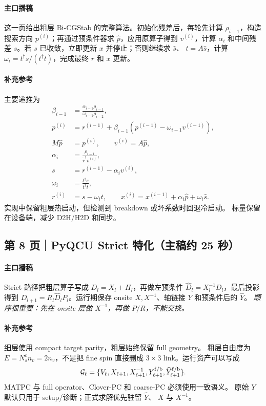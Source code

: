 \documentclass[UTF8,a4paper,11pt,fontset=none]{ctexart}
\begin{document}
\paragraph{主口播稿}
这一页给出粗层 Bi-CGStab 的完整算法。初始化残差后，每轮先计算
\(\rho_{i-1}\)，构造搜索方向 \(p^{(i)}\)；再通过预条件器求
\(\hat p\)，应用原算子得到 \(v^{(i)}\)，计算 \(\alpha_i\) 和中间残差
\(s\)。若 \(s\) 已收敛，立即更新 \(x\) 并停止；否则继续求 \(\hat s\)、
\(t=A\hat s\)，计算 \(\omega_i=t^\dagger s/(t^\dagger t)\)，完成最终
\(r\) 和 \(x\) 更新。

\paragraph{补充参考}
主要递推为
\begin{align}
\beta_{i-1}&=
\frac{\alpha_{i-1}\rho_{i-1}}
{\omega_{i-1}\rho_{i-2}},\\
p^{(i)}&=r^{(i-1)}
+\beta_{i-1}\left(p^{(i-1)}-\omega_{i-1}v^{(i-1)}\right),\\
M\hat p&=p^{(i)},\qquad v^{(i)}=A\hat p,\\
\alpha_i&=\frac{\rho_{i-1}}{\tilde r^\dagger v^{(i)}},\\
s&=r^{(i-1)}-\alpha_i v^{(i)},\\
\omega_i&=\frac{t^\dagger s}{t^\dagger t},\\
r^{(i)}&=s-\omega_i t,\qquad
x^{(i)}=x^{(i-1)}+\alpha_i\hat p+\omega_i\hat s.
\end{align}
实现中保留粗层热启动，但检测到 breakdown 或坏系数时回退冷启动。
标量保留在设备端，减少 D2H/H2D 和同步。

\subsection{第 8 页｜PyQCU Strict 特化（主稿约 25 秒）}

\paragraph{主口播稿}
Strict 路径把粗层算子写成 \(D_l=X_l+H_l\)，再做左预条件
\(\widehat D_l=X_l^{-1}D_l\)，最后投影得到
\(D_{l+1}=R_l\widehat D_lP_l\)。运行期保存 onsite
\(X,X^{-1}\)、轴链接 \(Y\) 和预条件后的 \(\widehat Y\)。
\emph{顺序很重要：先在 onsite 层做 \(X^{-1}\)，再做 \(P/R\)，不能交换。}

\paragraph{补充参考}
细层使用 compact target parity，粗层始终保留 full geometry。
粗层自由度为 \(E=N_s^c n_v=2n_v\)，不是把 fine spin 直接删成
\(3\times3\) link。运行资产可以写成
\[
\mathcal G_\ell=
\{V_\ell,X_{\ell+1},X_{\ell+1}^{-1},
Y_{\ell+1}^{\rm f/b},\widehat Y_{\ell+1}^{\rm f/b}\}.
\]
MATPC 与 full operator、Clover-PC 和 coarse-PC 必须使用一致语义。
原始 \(Y\) 默认只用于 setup/诊断；正式求解优先驻留 \(\widehat Y\)、
\(X\) 与 \(X^{-1}\)。
\end{document}
